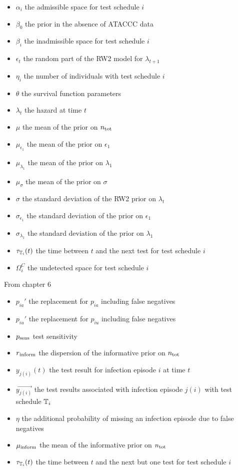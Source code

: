\documentclass[thesis.tex]{subfiles}
\begin{document}
\begin{itemize}
    \item $\alpha_i$ the admissible space for test schedule $i$
    \item $\beta_0$ the prior in the absence of ATACCC data
    \item $\beta_i$ the inadmissible space for test schedule $i$
    \item $\epsilon_t$ the random part of the RW2 model for $\lambda_{t+1}$
    \item $\eta_i$ the number of individuals with test schedule $i$
    \item $\theta$ the survival function parameters
    \item $\lambda_t$ the hazard at time $t$
    \item $\mu$ the mean of the prior on $n_\text{tot}$
    \item $\mu_{\epsilon_1}$ the mean of the prior on $\epsilon_1$
    \item $\mu_{\lambda_1}$ the mean of the prior on $\lambda_1$
    \item $\mu_\sigma$ the mean of the prior on $\sigma$
    \item $\sigma$ the standard deviation of the RW2 prior on $\lambda_t$
    \item $\sigma_{\epsilon_1}$ the standard deviation of the prior on $\epsilon_1$
    \item $\sigma_{\lambda_1}$ the standard deviation of the prior on $\lambda_1$
    \item $\tau_{\mathbb{T}_i}(t)$ the time between $t$ and the next test for test schedule $i$
    \item $\Omega_i^C$ the undetected space for test schedule $i$
\end{itemize}

From chapter 6
\begin{itemize}
    \item $p_{ia}'$ the replacement for $p_{ia}$ including false negatives
    \item $p_{iu}'$ the replacement for $p_{iu}$ including false negatives
    \item $p_\text{sens}$ test sensitivity
    \item $r{_{\text{inform}}}$ the dispersion of the informative prior on $n_\text{tot}$
    \item $y_{j(i)}(t)$ the test result for infection episode $i$ at time $t$
    \item $\vec{y_{j(i)}}$ the test results associated with infection episode $j(i)$ with test schedule $\mathbb{T}_i$
    \item $\eta$ the additional probability of missing an infection episode due to false negatives
    \item $\mu{_{\text{inform}}}$ the mean of the informative prior on $n_\text{tot}$
    \item $\tau_{\mathbb{T}_i}(t)$ the time between $t$ and the next but one test for test schedule $i$
\end{itemize}
\end{document}
